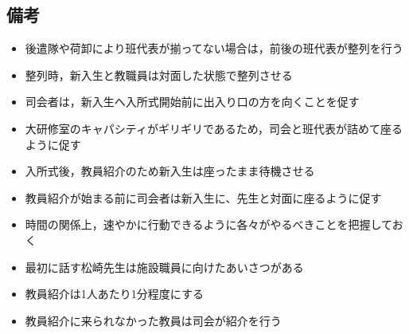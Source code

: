 \subsection{備考}
\begin{itemize}
\item 後遣隊や荷卸により班代表が揃ってない場合は，前後の班代表が整列を行う
\item 整列時，新入生と教職員は対面した状態で整列させる
\item 司会者は，新入生へ入所式開始前に出入り口の方を向くことを促す
\item 大研修室のキャパシティがギリギリであるため，司会と班代表が詰めて座るように促す
\item 入所式後，教員紹介のため新入生は座ったまま待機させる
\item 教員紹介が始まる前に司会者は新入生に、先生と対面に座るように促す
\item 時間の関係上，速やかに行動できるように各々がやるべきことを把握しておく
\item 最初に話す松崎先生は施設職員に向けたあいさつがある
\item 教員紹介は1人あたり1分程度にする
\item 教員紹介に来られなかった教員は司会が紹介を行う
\end{itemize}



%

